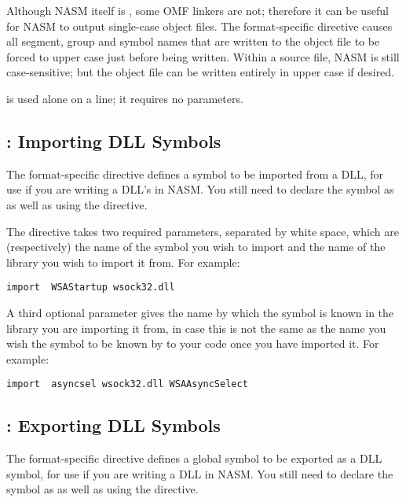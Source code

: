 Although NASM itself is , some OMF linkers are
not; therefore it can be useful for NASM to output single-case
object files. The  format-specific directive causes all
segment, group and symbol names that are written to the object file
to be forced to upper case just before being written. Within a
source file, NASM is still case-sensitive; but the object file can
be written entirely in upper case if desired.

 is used alone on a line; it requires no parameters.

\subsection{: Importing DLL Symbols}
\label{subsec:import}

The  format-specific directive defines a symbol to be
imported from a DLL, for use if you are writing a DLL's
 in NASM. You still need to declare the
symbol as  as well as using the 
directive.

The  directive takes two required parameters, separated
by white space, which are (respectively) the name of the symbol you
wish to import and the name of the library you wish to import it
from. For example:

\begin{lstlisting}
import  WSAStartup wsock32.dll
\end{lstlisting}

A third optional parameter gives the name by which the symbol is
known in the library you are importing it from, in case this is not
the same as the name you wish the symbol to be known by to your code
once you have imported it. For example:

\begin{lstlisting}
import  asyncsel wsock32.dll WSAAsyncSelect
\end{lstlisting}

\subsection{: Exporting DLL Symbols}
\label{subsec:export}

The  format-specific directive defines a global
symbol to be exported as a DLL symbol, for use if you are
writing a DLL in NASM. You still need to declare the symbol
as  as well as using the  directive.

